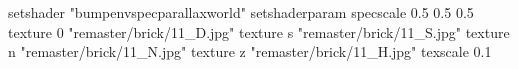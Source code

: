 setshader "bumpenvspecparallaxworld"
setshaderparam specscale 0.5 0.5 0.5
    texture 0 "remaster/brick/11_D.jpg"
    texture s "remaster/brick/11_S.jpg"
    texture n "remaster/brick/11_N.jpg"
    texture z "remaster/brick/11_H.jpg"
    texscale 0.1